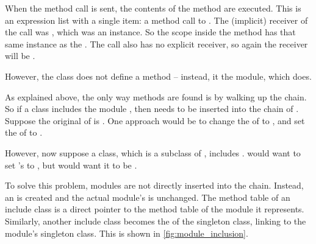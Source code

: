 When the  method call is sent, the contents of the method are executed. This is an expression list with a single item: a method call to . The (implicit) receiver of the  call was , which was an  instance. So the scope inside the method has that same  instance as the . The  call also has no explicit receiver, so again the receiver will be .

However, the  class does not define a  method -- instead, it  the  module, which does.

As explained above, the only way methods are found is by walking up the  chain. So if a class  includes the module , then  needs to be inserted into the  chain of . Suppose the original  of  is . One approach would be to change the  of  to , and set the  of  to .

However, now suppose a  class, which is a subclass of , includes .  would want to set 's  to , but  would want it to be .

To solve this problem, modules are not directly inserted into the  chain. Instead, an  is created and the actual module's  is unchanged. The method table of an include class is a direct pointer to the method table of the module it represents. Similarly, another include class becomes the  of the singleton class, linking to the module's singleton class. This is shown in \autoref{fig:module_inclusion}.

